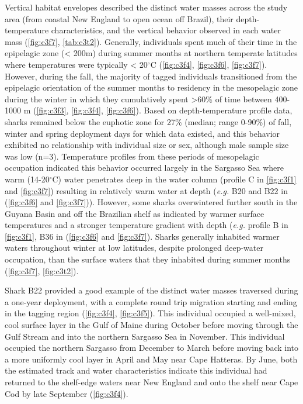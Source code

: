 Vertical habitat envelopes described the distinct water masses across the study area (from coastal New England to open ocean off Brazil), their depth-temperature characteristics, and the vertical behavior observed in each water mass (\cref{fig:c3f7}, \cref{tab:c3t2}). Generally, individuals spent much of their time in the epipelagic zone (< 200m) during summer months at northern temperate latitudes where temperatures were typically < 20$^{\circ}$C (\cref{fig:c3f4}, \cref{fig:c3f6}, \cref{fig:c3f7}). However, during the fall, the majority of tagged individuals transitioned from the epipelagic orientation of the summer months to residency in the mesopelagic zone during the winter in which they cumulatively spent >60\% of time between 400-1000 m (\cref{fig:c3f3}, \cref{fig:c3f4}, \cref{fig:c3f6}). Based on depth-temperature profile data, sharks remained below the euphotic zone for 27\% (median; range 0-90\%) of fall, winter and spring deployment days for which data existed, and this behavior exhibited no relationship with individual size or sex, although male sample size was low (n=3). Temperature profiles from these periods of mesopelagic occupation indicated this behavior occurred largely in the Sargasso Sea where warm (14-20$^{\circ}$C) water penetrates deep in the water column (profile C in \cref{fig:c3f1} and \cref{fig:c3f7}) resulting in relatively warm water at depth (\emph{e.g.} B20 and B22 in (\cref{fig:c3f6} and \cref{fig:c3f7})). However, some sharks overwintered further south in the Guyana Basin and off the Brazilian shelf as indicated by warmer surface temperatures and a stronger temperature gradient with depth (\emph{e.g.} profile B in \cref{fig:c3f1}, B36 in (\cref{fig:c3f6} and \cref{fig:c3f7}). Sharks generally inhabited warmer waters throughout winter at low latitudes, despite prolonged deep-water occupation, than the surface waters that they inhabited during summer months (\cref{fig:c3f7}, \cref{fig:c3t2}).

Shark B22 provided a good example of the distinct water masses traversed during a one-year deployment, with a complete round trip migration starting and ending in the tagging region (\cref{fig:c3f4}, \cref{fig:c3f5}). This individual occupied a well-mixed, cool surface layer in the Gulf of Maine during October before moving through the Gulf Stream and into the northern Sargasso Sea in November. This individual occupied the northern Sargasso from December to March before moving back into a more uniformly cool layer in April and May near Cape Hatteras. By June, both the estimated track and water characteristics indicate this individual had returned to the shelf-edge waters near New England and onto the shelf near Cape Cod by late September (\cref{fig:c3f4}).

